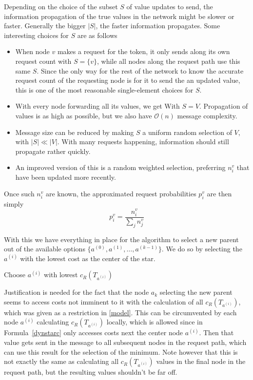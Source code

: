 \documentclass[a4paper, oneside]{discothesis}
\begin{document}
Depending on the choice of the subset $S$ of value updates to send, the information propagation of the true values in the network might be slower or faster. Generally the bigger $|S|$, the faster information propagates. Some interesting choices for $S$ are as follows
\begin{itemize}
\item When node $v$ makes a request for the token, it only sends along its own request count with $S=\{v\}$, while all nodes along the request path use this same $S$. Since the only way for the rest of the network to know the accurate request count of the requesting node is for it to send the an updated value, this is one of the most reasonable single-element choices for $S$.
\item With every node forwarding all its values, we get With $S=V$. Propagation of values is as high as possible, but we also have $\mathcal{O}(n)$ message complexity.
\item Message size can be reduced by making $S$ a uniform random selection of $V$, with $|S|\ll|V|$. With many requests happening, information should still propagate rather quickly.
\item An improved version of this is a random weighted selection, preferring $n_i^v$ that have been updated more recently.
\end{itemize}

Once such $n_i^v$ are known, the approximated request probabilities $p_i^v$ are then simply
\begin{equation}
p_i^v=\frac{n_i^v}{\sum_jn_j^v}
\end{equation}

With this we have everything in place for the algorithm to select a new parent out of the available options $\{a^{(0)},a^{(1)},\dots,a^{(k-1)}\}$. We do so by selecting the $a^{(i)}$ with the lowest cost as the center of the star.

\begin{algorithmic}
\State\Return Choose $a^{(i)}$ with lowest $c_R(T_{a^{(i)}})$
\EndFunction
\end{algorithmic}

Justification is needed for the fact that the node $a_k$ selecting the new parent seems to access costs not imminent to it with the calculation of all $c_R(T_{a^{(i)}})$, which was given as a restriction in \ref{model}. This can be circumvented by each node $a^{(i)}$ calculating $c_R(T_{a^{(i)}})$ locally, which is allowed since in Formula~\ref{dynstarc} only accesses costs next the center node $a^{(i)}$. Then that value gets sent in the message to all subsequent nodes in the request path, which can use this result for the selection of the minimum. Note however that this is not exactly the same as calculating all $c_R(T_{a^{(i)}})$ values in the final node in the request path, but the resulting values shouldn't be far off.
\end{document}
